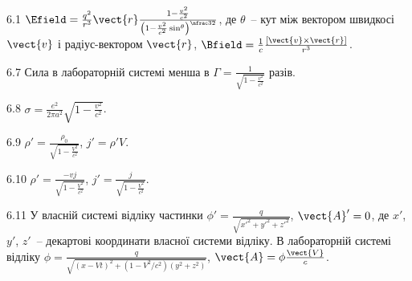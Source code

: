 \protect \section *{\protect {}}
\begin{Solution}{6.{1}}
	$\Efield = \frac{q^2}{r^3}\vect{r} \frac{1 - \frac{v^2}{c^2}}{ \left( 1 - \frac{v^2}{c^2}\sin^\theta \right)^{\nfrac32}}$, де $\theta$~-- кут між вектором швидкосі $\vect{v}$ і радіус-вектором $\vect{r}$, $\Bfield = \frac1c \frac{\left[ \vect{v}\times\vect{r}\right] }{r^3}$.
\end{Solution}
\begin{Solution}{6.{7}}
	Сила в лабораторній системі менша в $\Gamma = \frac{1}{\sqrt{1- \frac{v^2}{c^2}}}$ разів.
\end{Solution}
\begin{Solution}{6.{8}}
	$\sigma  = \frac{e^2}{2\pi a^2}\sqrt{1 - \frac{v^2}{c^2}}$.
\end{Solution}
\begin{Solution}{6.{9}}
	$\rho' = \frac{\rho_0}{\sqrt{1 - \frac{V^2}{c^2}}}$, $j' = \rho' V$.
\end{Solution}
\begin{Solution}{6.{10}}
	$\rho' = \frac{- v j}{\sqrt{1 - \frac{V^2}{c^2}}}$, $j' = \frac{j}{\sqrt{1 - \frac{V^2}{c^2}}}$.
\end{Solution}
\begin{Solution}{6.{11}}
	У власній системі відліку частинки $\phi'  = \frac{q}{\sqrt{x'^2 + y'^2 + z'^2}}$, $\vect{A}' = 0$, де $x'$, $y'$, $z'$~-- декартові координати власної системи відліку.
	В лабораторній системі відліку $\phi = \frac{q}{\sqrt{(x - Vt)^2 + \left( 1 - V^2/c^2\right)(y^2 + z^2) }}$, $\vect{A} = \phi\frac{\vect{V}}{c}$.
\end{Solution}
